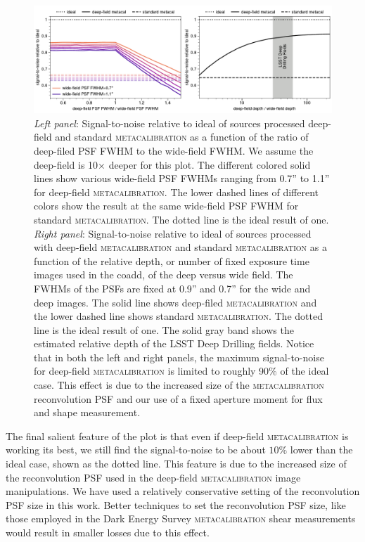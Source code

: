 \documentclass[twocolumn]{openjournal}
\makeatletter
\newcommand{\mcal}{\textsc{metacalibration}\@\xspace}
\makeatother
\begin{document}
\begin{figure}
    \centering
    \includegraphics[width=\textwidth]{s2n_ratio.pdf}
    \caption{
      \textit{Left panel}: Signal-to-noise relative to ideal of sources processed deep-field and standard \mcal
      as a function of the ratio of deep-filed PSF FWHM to the wide-field FWHM. We assume the deep-field is
      10$\times$ deeper for this plot. The different colored solid lines show various wide-field PSF FWHMs ranging from 0.7'' to
      1.1'' for deep-field \mcal. The lower dashed lines of different colors show the result at the same wide-field PSF FWHM for
      standard \mcal. The dotted line is the ideal result of one.
      \textit{Right panel}: Signal-to-noise relative to ideal of sources processed with deep-field \mcal and standard \mcal as a function of the relative depth, or number of fixed exposure time images
      used in the coadd,
      of the deep versus wide field. The FWHMs of the PSFs are fixed at 0.9''
      and 0.7'' for the wide and deep images. The solid line shows deep-filed \mcal and the lower dashed line shows standard \mcal.
      The dotted line is the ideal result of one.
      The solid gray band shows the estimated relative depth of the LSST Deep Drilling fields.
      Notice that in both the left and right panels, the maximum signal-to-noise for deep-field \mcal is limited to roughly 90\% of
      the ideal case. This effect is due to the increased size of the \mcal reconvolution PSF and our use of a fixed aperture moment
      for flux and shape measurement.}
    \label{fig:s2n}
\end{figure}


The final salient feature of the plot is that even if deep-field \mcal is working its
best, we still find the signal-to-noise to be about $10\%$ lower than the ideal case,
shown as the dotted line. This feature is due to the increased size of the reconvolution
PSF used in the deep-field \mcal image manipulations. We have used a relatively
conservative setting of the reconvolution PSF size in this work. Better techniques to
set the reconvolution PSF size, like those employed in the Dark Energy Survey \mcal
shear measurements \citep{desy3shear} would result in smaller losses due to this effect.
\end{document}
